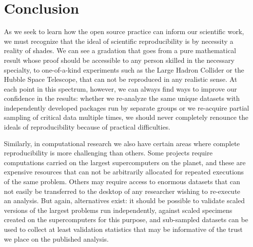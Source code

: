 \documentclass[ChapterTOCs,krantz2]{krantz} %
\theoremstyle{definition}
\begin{document}
\section{Conclusion}\label{conclusion}


As we seek to learn how the open source practice can inform our scientific
work, we must recognize that the ideal of scientific reproducibility
is by necessity a reality of shades. We can see a gradation that goes
from a pure mathematical result whose proof should be accessible to
any person skilled in the necessary specialty, to one-of-a-kind experiments
such as the Large Hadron Collider or the Hubble Space Telescope, that
can not be reproduced in any realistic sense. At each point in this
spectrum, however, we can always find ways to improve our confidence
in the results: whether we re-analyze the same unique datasets with
independently developed packages run by separate groups or we re-acquire
partial sampling of critical data multiple times, we should never
completely renounce the ideals of reproducibility because of practical
difficulties.

Similarly, in computational research we also have certain areas where
complete reproducibility is more challenging than others. Some projects
require computations carried on the largest supercomputers on the
planet, and these are expensive resources that can not be arbitrarily
allocated for repeated executions of the same problem. Others may
require access to enormous datasets that can not easily be transferred
to the desktop of any researcher wishing to re-execute an analysis.
But again, alternatives exist: it should be possible to validate scaled
versions of the largest problems run independently, against scaled
specimens created on the supercomputers for this purpose, and
sub-sampled datasets can be used to collect at least validation statistics
that may be informative of the trust we place on the published analysis.

%
\end{document}
